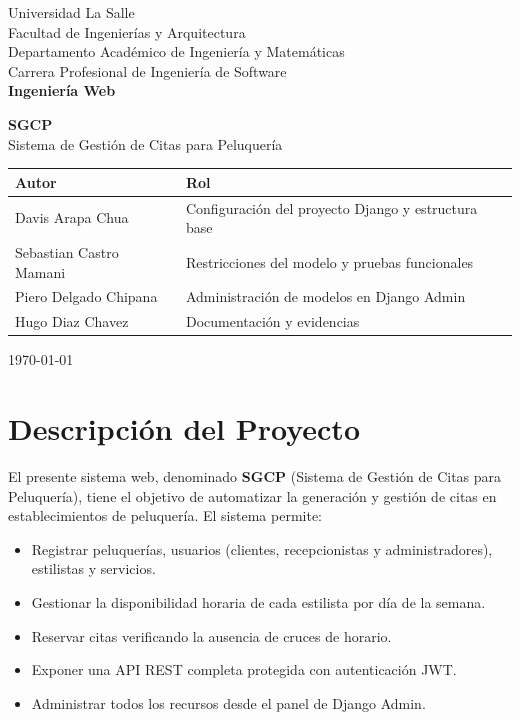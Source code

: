 \documentclass[12pt,a4paper]{article}
\begin{document}
\begin{titlepage}
    \centering
    \vspace*{1cm}
    {\large Universidad La Salle\\}
    {\large Facultad de Ingenierías y Arquitectura\\}
    {\large Departamento Académico de Ingeniería y Matemáticas\\}
    {\large Carrera Profesional de Ingeniería de Software\\[0.5cm]}
    {\large \textbf{Ingeniería Web}\\[2cm]}

    {\Huge \textbf{SGCP}\\[0.3cm]}
    {\Large Sistema de Gestión de Citas para Peluquería\\[2cm]}

    \begin{tabular}{ll}
        \toprule
        \textbf{Autor} & \textbf{Rol} \\
        \midrule
        Davis Arapa Chua     & Configuración del proyecto Django y estructura base \\
        Sebastian Castro Mamani & Restricciones del modelo y pruebas funcionales \\
        Piero Delgado Chipana   & Administración de modelos en Django Admin \\
        Hugo Diaz Chavez        & Documentación y evidencias \\
        \bottomrule
    \end{tabular}

    \vfill
    {\large \today}
\end{titlepage}

\tableofcontents
\newpage

\section{Descripción del Proyecto}

El presente sistema web, denominado \textbf{SGCP} (Sistema de Gestión de Citas para Peluquería),
tiene el objetivo de automatizar la generación y gestión de citas en establecimientos de peluquería.
El sistema permite:

\begin{itemize}
    \item Registrar peluquerías, usuarios (clientes, recepcionistas y administradores),
          estilistas y servicios.
    \item Gestionar la disponibilidad horaria de cada estilista por día de la semana.
    \item Reservar citas verificando la ausencia de cruces de horario.
    \item Exponer una API REST completa protegida con autenticación JWT.
    \item Administrar todos los recursos desde el panel de Django Admin.
\end{itemize}
\end{document}
